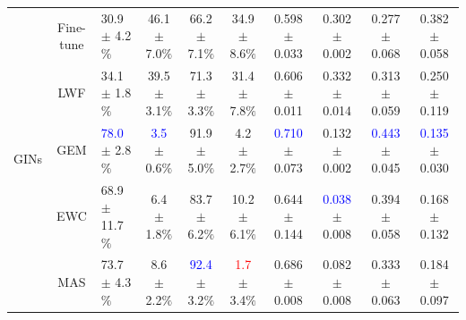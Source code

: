 \documentclass[letterpaper]{article} %
\begin{document}
\begin{table}[]
{\begin{tabular}{c|c|lc|cc|cc|cc}
                                                                        \toprule
\multirow{7}{*}{GINs}                                                   & Fine-tune                 & 30.9 $\pm$ 4.2$\%$ & 46.1 $\pm$ 7.0$\%$                          & 66.2 $\pm$ 7.1$\%$                           & 34.9 $\pm$ 8.6$\%$                         & 0.598 $\pm$ 0.033                           & 0.302 $\pm$ 0.002                           & 0.277 $\pm$ 0.068    & 0.382 $\pm$ 0.058                           \\ %
                                                                       & LWF                      & 34.1 $\pm$ 1.8$\%$ & 39.5 $\pm$ 3.1$\%$                          & 71.3 $\pm$ 3.3$\%$                           & 31.4 $\pm$ 7.8$\%$                           & 0.606 $\pm$ 0.011                           & 0.332 $\pm$ 0.014                           & 0.313 $\pm$ 0.059    & 0.250 $\pm$ 0.119                           \\
                                                                       & GEM                      & \textcolor{blue}{78.0} $\pm$ 2.8$\%$ & \textcolor{blue}{3.5} $\pm$ 0.6$\%$                           & 91.9 $\pm$ 5.0$\%$                           & 4.2 $\pm$ 2.7$\%$                           & \textcolor{blue}{0.710} $\pm$ 0.073                           & 0.132 $\pm$ 0.002                           & \textcolor{blue}{0.443} $\pm$ 0.045    & \textcolor{blue}{0.135} $\pm$ 0.030                             \\
                                                                                                    & EWC                      & 68.9 $\pm$ 11.7$\%$ & 6.4 $\pm$ 1.8$\%$                           & 83.7 $\pm$ 6.2$\%$                           & 10.2 $\pm$ 6.1$\%$                           & 0.644 $\pm$ 0.144                           & \textcolor{blue}{0.038} $\pm$ 0.008                           & 0.394 $\pm$ 0.058    & 0.168 $\pm$ 0.132                          \\
                                                                                                    & MAS                      & 73.7 $\pm$ 4.3$\%$ & 8.6 $\pm$ 2.2$\%$                           & \textcolor{blue}{92.4} $\pm$ 3.2$\%$                           & \textcolor{red}{1.7} $\pm$ 3.4$\%$                           & 0.686 $\pm$ 0.008                           & 0.082 $\pm$ 0.008                           & 0.333 $\pm$ 0.063    & 0.184 $\pm$ 0.097                          \\


\end{tabular}}
\end{table}
\end{document}

